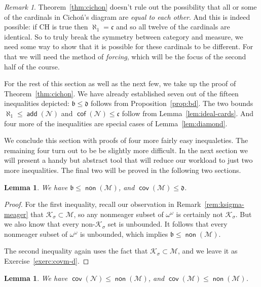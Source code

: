 \documentclass[11pt,oneside]{amsbook}
\newcommand{\Null}{\mathcal N}
\newcommand{\Meager}{\mathcal M}
\newcommand{\Ksigma}{\mathcal K_\sigma}
\DeclareMathOperator{\add}{\mathsf{add}}
\DeclareMathOperator{\non}{\mathsf{non}}
\DeclareMathOperator{\cov}{\mathsf{cov}}
\DeclareMathOperator{\cof}{\mathsf{cof}}
\theoremstyle{definition}
\theoremstyle{plain}
\newtheorem{lem}[thm]{Lemma}
\theoremstyle{definition}
\theoremstyle{remark}
\newtheorem{rem}[thm]{Remark}
\numberwithin{equation}{section}
\numberwithin{figure}{section}
\begin{document}
\begin{rem}
  Theorem~\ref{thm:cichon} doesn't rule out the possibility that all or some of the cardinals in Cicho\'n's diagram are \emph{equal to each other}. And this is indeed possible: if CH is true then $\aleph_1=\mathfrak c$ and so all twelve of the cardinals are identical. So to truly break the symmetry between category and measure, we need some way to show that it is possible for these cardinals to be different. For that we will need the method of \emph{forcing}, which will be the focus of the second half of the course.
\end{rem}

For the rest of this section as well as the next few, we take up the proof of Theorem~\ref{thm:cichon}. We have already established seven out of the fifteen inequalities depicted: $\mathfrak b\leq\mathfrak d$ follows from Proposition~\ref{prop:bd}. The two bounds $\aleph_1\leq\add(\Null)$ and $\cof(\Null)\leq\mathfrak c$ follow from Lemma~\ref{lem:ideal-cards}. And four more of the inequalities are special cases of Lemma~\ref{lem:diamond}.

We conclude this section with proofs of four more fairly easy inequaleties. The remaining four turn out to be be slightly more difficult. In the next section we will present a handy but abstract tool that will reduce our workload to just two more inequalities. The final two will be proved in the following two sections.

\begin{lem}
  \label{lem:b-nonm}
  We have $\mathfrak b\leq\non(\Meager)$, and $\cov(\Meager)\leq\mathfrak d$.
\end{lem}

\begin{proof}
  For the first inequality, recall our observation in Remark~\ref{rem:ksigma-meager} that $\Ksigma\subset\Meager$, so any nonmeager subset of $\omega^\omega$ is certainly not $\Ksigma$. But we also know that every non-$\Ksigma$ set is unbounded. It follows that every nonmeager subset of $\omega^\omega$ is unbounded, which implies $\mathfrak b\leq\non(\Meager)$.

  The second inequality again uses the fact that $\Ksigma\subset\Meager$, and we leave it as Exercise~\ref{exerc:covm-d}.
\end{proof}

\begin{lem}
  \label{lem:covn-nonm}
  We have $\cov(\Null)\leq\non(\Meager)$, and $\cov(\Meager)\leq\non(\Meager)$.
\end{lem}
\end{document}
